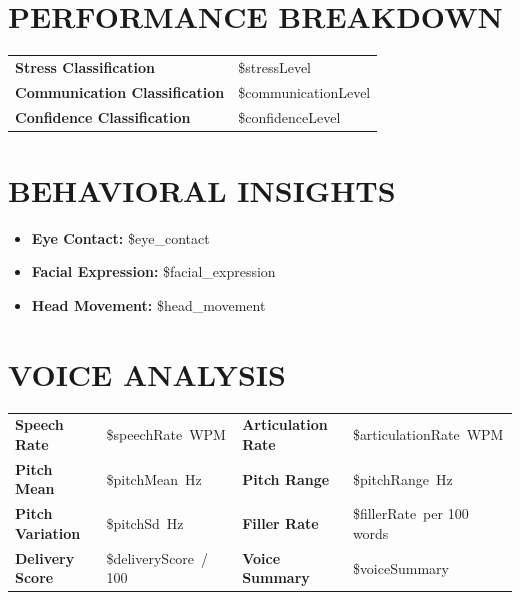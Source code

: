 \documentclass[11pt]{article}
\newcommand{\labelcell}[1]{%
  \textbf{\textcolor{WiseNavy}{#1}}%
}
\begin{document}
\vspace{0.4cm}

\section{PERFORMANCE BREAKDOWN}

\renewcommand{\arraystretch}{1.5}
\begin{tabularx}{\textwidth}{L{5cm} X}
  \labelcell{Stress Classification}        & \${stressLevel} \\
  \labelcell{Communication Classification} & \${communicationLevel} \\
  \labelcell{Confidence Classification}    & \${confidenceLevel} \\
\end{tabularx}
\renewcommand{\arraystretch}{1}

\vspace{0.4cm}

\section{BEHAVIORAL INSIGHTS}

\begin{itemize}[leftmargin=1.5em, itemsep=3pt, parsep=0pt]
  \item \labelcell{Eye Contact:}\quad \${eye\_contact}
  \item \labelcell{Facial Expression:}\quad \${facial\_expression}
  \item \labelcell{Head Movement:}\quad \${head\_movement}
\end{itemize}

\vspace{0.4cm}

\section{VOICE ANALYSIS}

\renewcommand{\arraystretch}{1.5}
\begin{tabularx}{\textwidth}{L{4.8cm} X L{4.8cm} X}
  \labelcell{Speech Rate}        & \${speechRate}\ WPM
    & \labelcell{Articulation Rate}     & \${articulationRate}\ WPM \\
  \labelcell{Pitch Mean}         & \${pitchMean}\ Hz
    & \labelcell{Pitch Range}           & \${pitchRange}\ Hz \\
  \labelcell{Pitch Variation}    & \${pitchSd}\ Hz
    & \labelcell{Filler Rate}           & \${fillerRate}\ per 100 words \\
  \labelcell{Delivery Score}     & \${deliveryScore}\ / 100
    & \labelcell{Voice Summary}         & \${voiceSummary} \\
\end{tabularx}
\renewcommand{\arraystretch}{1}
\end{document}
